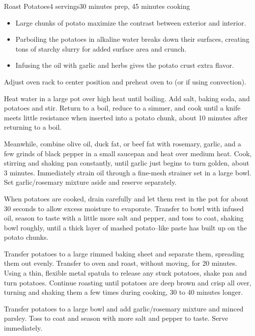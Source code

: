 \documentclass[../Cookbook.tex]{subfiles}
\begin{document}
\begin{recipe}{Roast Potatoes}{4 servings}{30 minutes prep, 45 minutes cooking}

\begin{itemize}
	\item Large chunks of potato maximize the contrast between exterior and interior.
	\item Parboiling the potatoes in alkaline water breaks down their surfaces, creating tons of starchy slurry for added surface area and crunch.
	\item Infusing the oil with garlic and herbs gives the potato crust extra flavor.
\end{itemize}

Adjust oven rack to center position and preheat oven to  (or  if using convection).

Heat water in a large pot over high heat until boiling. Add salt, baking soda, and potatoes and stir. Return to a boil, reduce to a simmer, and cook until a knife meets little resistance when inserted into a potato chunk, about 10 minutes after returning to a boil.

Meanwhile, combine olive oil, duck fat, or beef fat with rosemary, garlic, and a few grinds of black pepper in a small saucepan and heat over medium heat. Cook, stirring and shaking pan constantly, until garlic just begins to turn golden, about 3 minutes. Immediately strain oil through a fine-mesh strainer set in a large bowl. Set garlic/rosemary mixture aside and reserve separately.

\newstep
When potatoes are cooked, drain carefully and let them rest in the pot for about 30 seconds to allow excess moisture to evaporate. Transfer to bowl with infused oil, season to taste with a little more salt and pepper, and toss to coat, shaking bowl roughly, until a thick layer of mashed potato–like paste has built up on the potato chunks.

\newstep
Transfer potatoes to a large rimmed baking sheet and separate them, spreading them out evenly. Transfer to oven and roast, without moving, for 20 minutes. Using a thin, flexible metal spatula to release any stuck potatoes, shake pan and turn potatoes. Continue roasting until potatoes are deep brown and crisp all over, turning and shaking them a few times during cooking, 30 to 40 minutes longer.

\newstep
Transfer potatoes to a large bowl and add garlic/rosemary mixture and minced parsley. Toss to coat and season with more salt and pepper to taste. Serve immediately.

\end{recipe}
\end{document}
